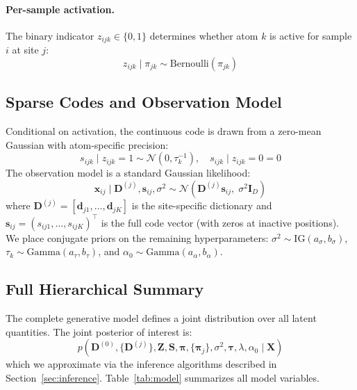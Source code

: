 \documentclass[11pt,a4paper]{article}
\theoremstyle{definition}
\begin{document}
\paragraph{Per-sample activation.} The binary indicator $z_{ijk} \in \{0,1\}$ determines whether atom $k$ is active for sample $i$ at site $j$:
\begin{equation}
  z_{ijk} \mid \pi_{jk} \sim \text{Bernoulli}(\pi_{jk}) \label{eq:z}
\end{equation}

\subsection{Sparse Codes and Observation Model}

Conditional on activation, the continuous code is drawn from a zero-mean Gaussian with atom-specific precision:
\begin{equation}
  s_{ijk} \mid z_{ijk}{=}1 \sim \mathcal{N}(0, \tau_k^{-1}), \quad s_{ijk} \mid z_{ijk}{=}0 = 0 \label{eq:code}
\end{equation}
The observation model is a standard Gaussian likelihood:
\begin{equation}
  \mathbf{x}_{ij} \mid \mathbf{D}^{(j)}, \mathbf{s}_{ij}, \sigma^2 \sim \mathcal{N}(\mathbf{D}^{(j)}\mathbf{s}_{ij},\; \sigma^2 \mathbf{I}_D) \label{eq:obs}
\end{equation}
where $\mathbf{D}^{(j)} = [\mathbf{d}_{j1}, \ldots, \mathbf{d}_{jK}]$ is the site-specific dictionary and $\mathbf{s}_{ij} = (s_{ij1}, \ldots, s_{ijK})^\top$ is the full code vector (with zeros at inactive positions). We place conjugate priors on the remaining hyperparameters: $\sigma^2 \sim \text{IG}(a_\sigma, b_\sigma)$, $\tau_k \sim \text{Gamma}(a_\tau, b_\tau)$, and $\alpha_0 \sim \text{Gamma}(a_\alpha, b_\alpha)$.

\subsection{Full Hierarchical Summary}

The complete generative model defines a joint distribution over all latent quantities. The joint posterior of interest is:
\begin{equation}
  p(\mathbf{D}^{(0)}, \{\mathbf{D}^{(j)}\}, \mathbf{Z}, \mathbf{S}, \boldsymbol{\pi}, \{\boldsymbol{\pi}_j\}, \sigma^2, \boldsymbol{\tau}, \lambda, \alpha_0 \mid \mathbf{X}) \label{eq:posterior}
\end{equation}
which we approximate via the inference algorithms described in Section~\ref{sec:inference}. Table~\ref{tab:model} summarizes all model variables.
\end{document}
